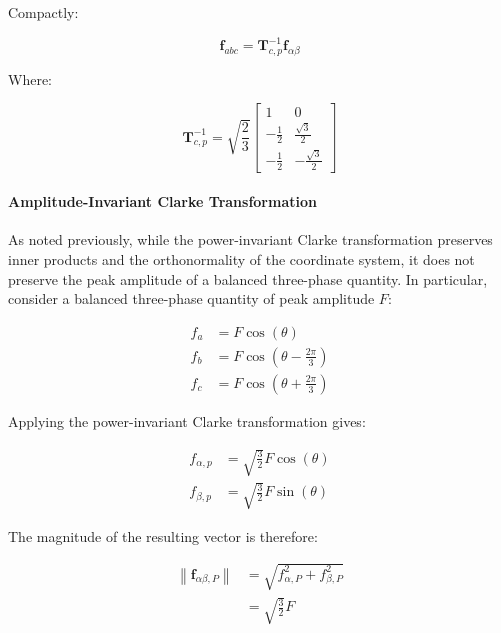 \documentclass{article}
\begin{document}
Compactly:

\begin{equation}
    \mathbf{f}_{abc}
    =
    \mathbf{T}_{c,p}^{-1}\mathbf{f}_{\alpha\beta}
\end{equation}

Where:

\begin{equation}
    \mathbf{T}_{c,p}^{-1}
    =
    \sqrt{\frac{2}{3}}
    \begin{bmatrix}
        1 & 0 \\[2mm]
        -\frac{1}{2} & \frac{\sqrt{3}}{2} \\[2mm]
        -\frac{1}{2} & -\frac{\sqrt{3}}{2}
    \end{bmatrix}
\end{equation}


\paragraph{Amplitude-Invariant Clarke Transformation}
\label{sec-amp-invar-clarke}

As noted previously, while the power-invariant Clarke transformation preserves inner products and the orthonormality of the coordinate system, it does not preserve the peak amplitude of a balanced three-phase quantity. In particular, consider a balanced three-phase quantity of peak amplitude $F$:

\begin{align}
    f_a &= F\cos(\theta) \\
    f_b &= F\cos\left(\theta-\frac{2\pi}{3}\right) \\
    f_c &= F\cos\left(\theta+\frac{2\pi}{3}\right)
\end{align}

Applying the power-invariant Clarke transformation gives:

\begin{align}
    f_{\alpha,p} &= \sqrt{\frac{3}{2}}F\cos(\theta) \\
    f_{\beta,p}  &= \sqrt{\frac{3}{2}}F\sin(\theta)
\end{align}

The magnitude of the resulting vector is therefore:

\begin{align}
    \left\|\mathbf{f}_{\alpha\beta,P}\right\|
    &= \sqrt{f_{\alpha,P}^{2}+f_{\beta,P}^{2}} \\
    &= \sqrt{\frac{3}{2}}F
    \label{PI-clarke-scaling}
\end{align}
\end{document}
